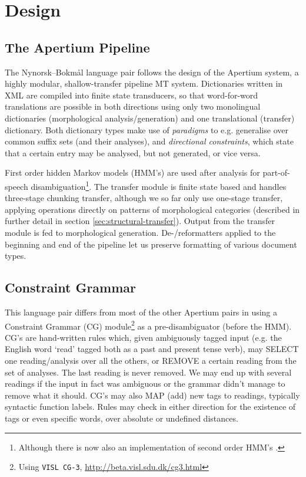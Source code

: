 \documentclass[11pt]{article}
\begin{document}
\section{Design}
 \label{sec:design}
\subsection{The Apertium Pipeline}
The Nynorsk–Bokmål language pair follows the design of the Apertium
system, a highly modular, shallow-transfer
pipeline MT system. Dictionaries written in XML are
compiled into finite state transducers, so that word-for-word
translations are possible in both directions using only two
monolingual dictionaries (morphological analysis/generation) and one
translational (transfer) dictionary. Both dictionary types make use of
\emph{paradigms} to e.g. generalise over common suffix sets (and their
analyses), and \emph{directional constraints}, which state that a
certain entry may be analysed, but not generated, or vice versa.

First order hidden Markov models (HMM's) are used after analysis for
part-of-speech disambiguation\footnote{Although there is now also an
  implementation of second order HMM's \citep{sheikh2009trigram}. }.
The transfer module is finite state based and handles three-stage
chunking transfer, although we so far only use one-stage transfer,
applying operations directly on patterns of morphological categories
(described in further detail in section
\ref{sec:structural-transfer}). Output from the transfer module is fed
to morphological generation. De-/reformatters applied to the
beginning and end of the pipeline let us preserve formatting of
various document types.

\subsection{Constraint Grammar}
This language pair differs from most of the other Apertium pairs in
using a Constraint Grammar (CG) module\footnote{Using {\tt \small VISL
    CG-3},
  \href{http://beta.visl.sdu.dk/cg3.html}{http://beta.visl.sdu.dk/cg3.html}
} as a pre-disambiguator (before the HMM). CG's
\citep{karlsson1990cgf} are hand-written rules which, given
ambiguously tagged input (e.g. the English word `read' tagged both as
a past and present tense verb), may SELECT one reading/analysis over
all the others, or REMOVE a certain reading from the set of
analyses. The last reading is never removed. We may end up with
several readings if the input in fact was ambiguous or the grammar
didn't manage to remove what it should. CG's may also MAP (add) new
tags to readings, typically syntactic function labels. Rules may check
in either direction for the existence of tags or even specific words,
over absolute or undefined distances.
\end{document}

